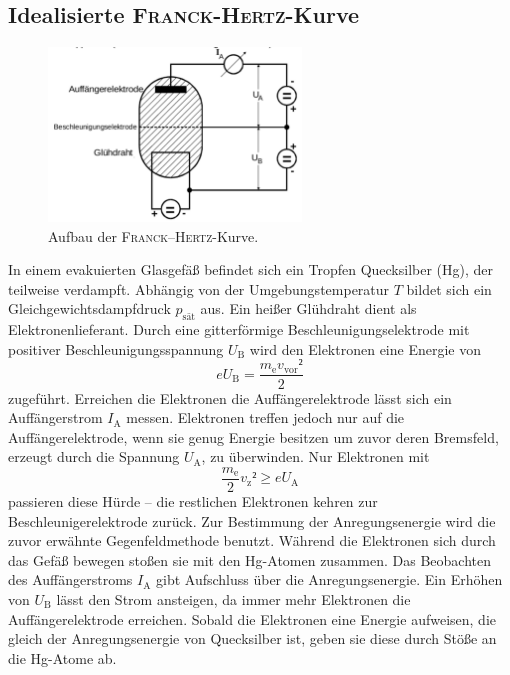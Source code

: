\subsection{Idealisierte \textsc{Franck}-\textsc{Hertz}-Kurve}
\begin{figure}
	\centering
	\includegraphics[width=0.6\textwidth]{Bilder/Aufbau.pdf}
	\caption{Aufbau der \textsc{Franck}--\textsc{Hertz}-Kurve.\cite{skript}}
\end{figure}
In einem evakuierten Glasgefäß befindet sich ein Tropfen Quecksilber (Hg), der teilweise verdampft. 
Abhängig von der Umgebungstemperatur $T$ bildet sich ein Gleichgewichtsdampfdruck $p_\mathup{sät}$ aus. 
Ein heißer Glühdraht dient als Elektronenlieferant.
Durch eine gitterförmige Beschleunigungselektrode mit positiver Beschleunigungsspannung $U_\mathup{B}$ wird den Elektronen eine Energie von 
\begin{equation}
	e U_\mathup{B}=\frac{m_\mathup{e}v_\mathup{vor}²}{2}
\end{equation}
zugeführt. 
Erreichen die Elektronen die Auffängerelektrode lässt sich ein Auffängerstrom $I_\mathup{A}$ messen. 
Elektronen treffen jedoch nur auf die Auffängerelektrode, wenn sie genug Energie besitzen um zuvor deren Bremsfeld, erzeugt durch die Spannung $U_\mathup{A}$, zu überwinden. 
Nur Elektronen mit 
\begin{equation}
	\frac{m_\mathup{e}}{2}v_\mathup{z}² \geq e U_\mathup{A}
\end{equation}
passieren diese Hürde -- die restlichen Elektronen kehren zur Beschleunigerelektrode zurück.
Zur Bestimmung der Anregungsenergie wird die zuvor erwähnte Gegenfeldmethode benutzt. 
Während die Elektronen sich durch das Gefäß bewegen stoßen sie mit den Hg-Atomen zusammen. 
Das Beobachten des Auffängerstroms $I_\mathup{A}$ gibt Aufschluss über die Anregungsenergie.
Ein Erhöhen von $U_\mathup{B}$ lässt den Strom ansteigen, da immer mehr Elektronen die Auffängerelektrode erreichen.
Sobald die Elektronen eine Energie aufweisen, die gleich der Anregungsenergie von Quecksilber ist, geben sie diese durch Stöße an die Hg-Atome ab. 
